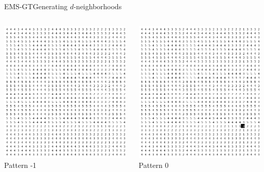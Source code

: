 \documentclass[pdf,xcolor={dvipsnames}]{beamer}
\begin{document}
\begin{frame}{EMS-GT}{Generating $d$-neighborhoods}
\begin{itemize}
{			\begin{columns}
			\scriptsize\centering
			\begin{column}{.135\textwidth}\centering\includegraphics[width=0.98\textwidth]{img/-1}\\Pattern -1\end{column}
			\begin{column}{.135\textwidth}\centering\includegraphics[width=0.98\textwidth]{img/0}\\Pattern 0 \end{column} 

\end{columns}}
\end{itemize}
\end{frame}
\end{document}
